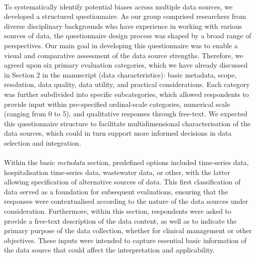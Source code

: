 \documentclass{article}
\begin{document}
\paragraph{}To systematically identify potential biases across multiple data sources, we developed a structured questionnaire. As our group comprised researchers from diverse disciplinary backgrounds who have experience in working with various sources of data, the questionnaire design process was shaped by a broad range of perspectives. Our main goal in developing this questionnaire was to enable a visual and comparative assessment of the data source strengths. Therefore, we agreed upon six primary evaluation categories, which we have already discussed in Section 2 in the manuscript (data characteristics): basic metadata, scope, resolution, data quality, data utility, and practical considerations. Each category was further subdivided into specific subcategories, which allowed respondents to provide input within pre-specified ordinal-scale categories, numerical scale (ranging from 0 to 5), and qualitative responses through free-text. We expected this questionnaire structure to facilitate multidimensional characterisation of the data sources, which could in turn support more informed decisions in data selection and integration. 

\paragraph{}Within the basic \textit{metadata} section, predefined options included time-series data, hospitalisation time-series data, wastewater data, or other, with the latter allowing specification of alternative sources of data. This first classification of data served as a foundation for subsequent evaluations, ensuring that the responses were contextualised according to the nature of the data sources under consideration. Furthermore, within this section, respondents were asked to provide a free-text description of the data content, as well as to indicate the primary purpose of the data collection, whether for clinical management or other objectives. These inputs were intended to capture essential basic information of the data source that could affect the interpretation and applicability. 
\end{document}
